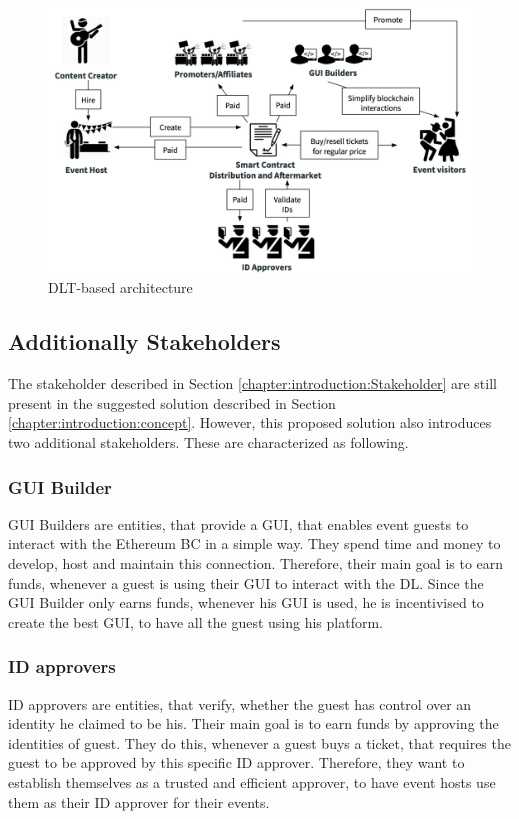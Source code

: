 \begin{figure}[H]
    \centering
    \includegraphics[width=16cm]{figures/dlt-based-landscape.png}
    \caption{DLT-based architecture}
    \label{fig:dlt-based-landscape1}
\end{figure}

\subsection{Additionally Stakeholders}

The stakeholder described in Section \ref{chapter:introduction:Stakeholder} are still present in the suggested solution described in Section \ref{chapter:introduction:concept}.
However, this proposed solution also introduces two additional stakeholders. These are characterized as following.

\subsubsection{GUI Builder}
GUI Builders are entities, that provide a GUI, that enables event guests to interact with the Ethereum BC in a simple way. They spend time and money to develop, host and maintain this connection. Therefore, their main goal is to earn funds, whenever a guest is using their GUI to interact with the DL. Since the GUI Builder only earns funds, whenever his GUI is used, he is incentivised to create the best GUI, to have all the guest using his platform.

\subsubsection{ID approvers}
ID approvers are entities, that verify, whether the guest has control over an identity he claimed to be his. Their main goal is to earn funds by approving the identities of guest. They do this, whenever a guest buys a ticket, that requires the guest to be approved by this specific ID approver. Therefore, they want to establish themselves as a trusted and efficient approver, to have event hosts use them as their ID approver for their events.

